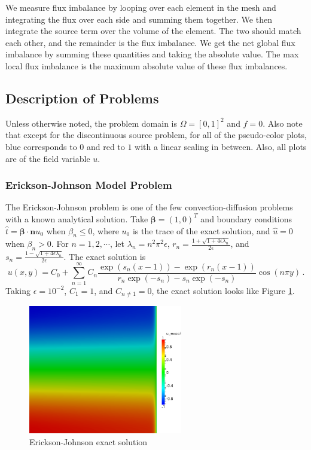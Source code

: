 \documentclass[letterpaper]{article}
\def\bbeta{\boldsymbol\beta}
\begin{document}
We measure flux imbalance by looping over each element in the mesh and
integrating the flux over each side and summing them together. We then
integrate the source term over the volume of the element. The two should match
each other, and the remainder is the flux imbalance. We get the net global
flux imbalance by summing these quantities and taking the absolute value. The
max local flux imbalance is the maximum absolute value of these flux
imbalances.

\subsection{Description of Problems}\label{sec:problemDescriptions}
Unless otherwise noted, the problem domain is $\Omega=[0,1]^2$ and $f=0$. Also
note that except for the discontinuous source problem, for all of the
pseudo-color plots, blue corresponds to $0$ and red to $1$ with a linear
scaling in between. Also, all plots are of the field variable $u$.

\subsubsection{Erickson-Johnson Model Problem}
The Erickson-Johnson problem is one of the few convection-diffusion problems
with a known analytical solution. Take
$\bbeta=(1,0)^T$ and boundary conditions $\hat t=\bbeta\cdot\mathbf{n} u_0$ when
$\beta_n\le0$, where $u_0$ is the trace of the exact solution, and $\hat u=0$
when $\beta_n>0$. For
$n=1,2,\cdots$, let
$\lambda_n=n^2\pi^2\epsilon$,
$r_n=\frac{1+\sqrt{1+4\epsilon\lambda_n}}{2\epsilon}$, and
$s_n=\frac{1-\sqrt{1+4\epsilon\lambda_n}}{2\epsilon}$. The exact solution
is
\begin{equation}
u(x,y)=C_0+\sum_{n=1}^\infty C_n\frac{\exp(s_n(x-1))-\exp(r_n(x-1))}
{r_n\exp(-s_n)-s_n\exp(-s_n)}\cos(n\pi y)\,.
\label{eq:ericksonExact}
\end{equation}
Taking $\epsilon=10^{-2}$, $C_1=1$, and $C_{n\neq1}=0$, the exact solution looks
like Figure \ref{fig:erickson}.

\begin{figure}[p]
\centering
\includegraphics[width=0.6\textwidth]{figs/Erickson/exact.png}
\caption{Erickson-Johnson exact solution}
\label{fig:erickson}
\end{figure}
\end{document}
